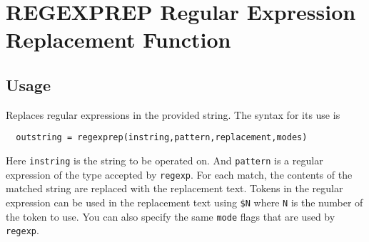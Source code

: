 \section{REGEXPREP Regular Expression Replacement Function}

\subsection{Usage}

Replaces regular expressions in the provided string.  The syntax for its
use is 
\begin{verbatim}
  outstring = regexprep(instring,pattern,replacement,modes)
\end{verbatim}
Here \verb|instring| is the string to be operated on.  And \verb|pattern| is a regular
expression of the type accepted by \verb|regexp|.  For each match, the contents
of the matched string are replaced with the replacement text.  Tokens in the
regular expression can be used in the replacement text using \verb|$N| where \verb|N|
is the number of the token to use.  You can also specify the same \verb|mode| 
flags that are used by \verb|regexp|.
